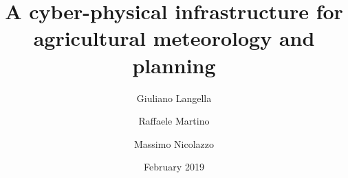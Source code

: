 \documentclass[authoryear,preprint,review,12pt]{elsarticle}
\begin{document}
\begin{frontmatter}



\title{A cyber-physical infrastructure for agricultural meteorology and planning}


\author[dia]{Giuliano Langella}
\address[dia]{Department of Agriculture, University of Naples Federico II, Via Università 100, 80055 Portici, NA, Italy}

\author[deeit]{Raffaele Martino}
\author[deeit]{Massimo Nicolazzo}
\address[deeit]{Department of Electrical Engineering and Information Technology, University of Naples Federico II, Via Claudio 21, 80125 Naples, NA, Italy}

\date{February 2019}


\end{frontmatter}
\end{document}
